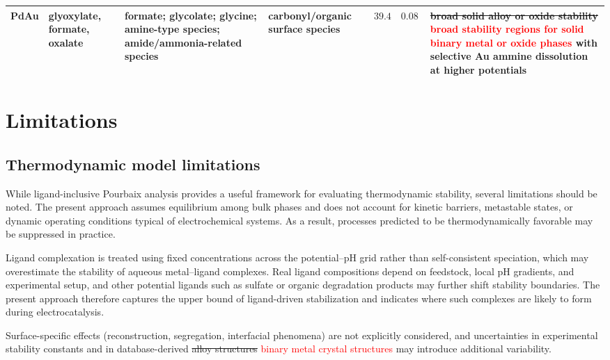 \documentclass[twoside,twocolumn,9pt]{article}
\begin{document}
\begin{table}[ht]
\begin{tabular}{L{1.1cm} L{2.7cm} L{4.0cm} L{2.8cm} L{1.8cm} L{2.0cm} L{3.2cm}}
PdAu & 
glyoxylate, formate, oxalate & 
formate; glycolate; glycine; amine-type species; amide/ammonia-related species & 
carbonyl/organic surface species & 
{\( 39.4\)} & 
{\( 0.08~\)} & 
\sout{broad solid alloy or oxide stability} \textcolor{red}{broad stability regions for solid binary metal or oxide phases} with selective Au ammine dissolution at higher potentials \\


\bottomrule
\end{tabular}
\end{table}

\section{Limitations}
\subsection{Thermodynamic model limitations}
While ligand-inclusive Pourbaix analysis provides a useful framework for evaluating thermodynamic stability, several limitations should be noted. The present approach assumes equilibrium among bulk phases and does not account for kinetic barriers, metastable states, or dynamic operating conditions typical of electrochemical systems. As a result, processes predicted to be thermodynamically favorable may be suppressed in practice.

Ligand complexation is treated using fixed concentrations across the potential–pH grid rather than self-consistent speciation, which may overestimate the stability of aqueous metal–ligand complexes. Real ligand compositions depend on feedstock, local pH gradients, and experimental setup, and other potential ligands such as sulfate or organic degradation products may further shift stability boundaries. The present approach therefore captures the upper bound of ligand-driven stabilization and indicates where such complexes are likely to form during electrocatalysis.

Surface-specific effects (reconstruction, segregation, interfacial phenomena) are not explicitly considered, and uncertainties in experimental stability constants and in database-derived \sout{alloy structures} \textcolor{red}{binary metal crystal structures} may introduce additional variability. 
\end{document}
